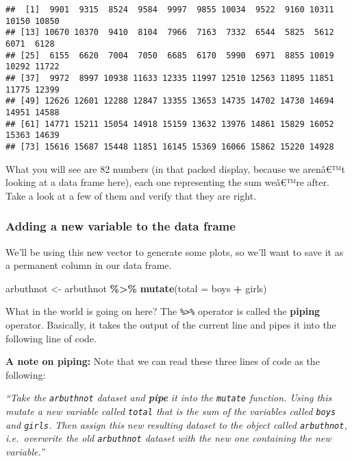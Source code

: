 \documentclass[
]{article}
\newenvironment{Shaded}{\begin{snugshade}}{\end{snugshade}}
\newcommand{\AttributeTok}[1]{\textcolor[rgb]{0.13,0.29,0.53}{#1}}
\newcommand{\FunctionTok}[1]{\textcolor[rgb]{0.13,0.29,0.53}{\textbf{#1}}}
\newcommand{\NormalTok}[1]{#1}
\newcommand{\OtherTok}[1]{\textcolor[rgb]{0.56,0.35,0.01}{#1}}
\newcommand{\SpecialCharTok}[1]{\textcolor[rgb]{0.81,0.36,0.00}{\textbf{#1}}}
\begin{document}
\begin{verbatim}
##  [1]  9901  9315  8524  9584  9997  9855 10034  9522  9160 10311 10150 10850
## [13] 10670 10370  9410  8104  7966  7163  7332  6544  5825  5612  6071  6128
## [25]  6155  6620  7004  7050  6685  6170  5990  6971  8855 10019 10292 11722
## [37]  9972  8997 10938 11633 12335 11997 12510 12563 11895 11851 11775 12399
## [49] 12626 12601 12288 12847 13355 13653 14735 14702 14730 14694 14951 14588
## [61] 14771 15211 15054 14918 15159 13632 13976 14861 15829 16052 15363 14639
## [73] 15616 15687 15448 11851 16145 15369 16066 15862 15220 14928
\end{verbatim}

What you will see are 82 numbers (in that packed display, because we
arenâ€™t looking at a data frame here), each one representing the sum
weâ€™re after. Take a look at a few of them and verify that they are
right.

\subsubsection{Adding a new variable to the data
frame}\label{adding-a-new-variable-to-the-data-frame}

We'll be using this new vector to generate some plots, so we'll want to
save it as a permanent column in our data frame.

\begin{Shaded}
\begin{Highlighting}[]
\NormalTok{arbuthnot }\OtherTok{\textless{}{-}}\NormalTok{ arbuthnot }\SpecialCharTok{\%\textgreater{}\%}
  \FunctionTok{mutate}\NormalTok{(}\AttributeTok{total =}\NormalTok{ boys }\SpecialCharTok{+}\NormalTok{ girls)}
\end{Highlighting}
\end{Shaded}

What in the world is going on here? The \texttt{\%\textgreater{}\%}
operator is called the \textbf{piping} operator. Basically, it takes the
output of the current line and pipes it into the following line of code.

\label{boxedtext}
\textbf{A note on piping: } Note that we can read these three lines of
code as the following:

\emph{``Take the \texttt{arbuthnot} dataset and \textbf{pipe} it into
the \texttt{mutate} function. Using this mutate a new variable called
\texttt{total} that is the sum of the variables called \texttt{boys} and
\texttt{girls}. Then assign this new resulting dataset to the object
called \texttt{arbuthnot}, i.e.~overwrite the old \texttt{arbuthnot}
dataset with the new one containing the new variable.''}
\end{document}
